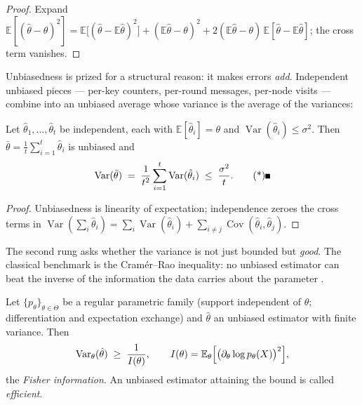 \begin{proof}
Expand $\mathbb{E}[(\hat\theta-\theta)^2] =
\mathbb{E}\bigl[(\hat\theta-\mathbb{E}\hat\theta)^2\bigr] +
(\mathbb{E}\hat\theta-\theta)^2 + 2(\mathbb{E}\hat\theta-\theta)\,
\mathbb{E}[\hat\theta-\mathbb{E}\hat\theta]$; the cross term vanishes.
\end{proof}

Unbiasedness is prized for a structural reason: it makes errors \emph{add}. Independent unbiased
pieces --- per-key counters, per-round messages, per-node visits --- combine into an unbiased
average whose variance is the average of the variances:

\begin{lemma}\label{lem:est-averaging}
Let $\hat\theta_1,\dots,\hat\theta_t$ be independent, each with
$\mathbb{E}[\hat\theta_i] = \theta$ and $\operatorname{Var}(\hat\theta_i) \le \sigma^2$. Then
$\bar\theta = \frac1t\sum_{i=1}^t \hat\theta_i$ is unbiased and
\[
\operatorname{Var}(\bar\theta) \;=\; \frac{1}{t^2}\sum_{i=1}^t
\operatorname{Var}(\hat\theta_i) \;\le\; \frac{\sigma^2}{t}. \eopm
\]
\end{lemma}

\begin{proof}
Unbiasedness is linearity of expectation; independence zeroes the cross terms in
$\operatorname{Var}(\sum_i \hat\theta_i) = \sum_i \operatorname{Var}(\hat\theta_i) +
\sum_{i\ne j}\operatorname{Cov}(\hat\theta_i,\hat\theta_j)$.
\end{proof}


The second rung asks whether the variance is not just bounded but \emph{good}. The classical
benchmark is the Cram\'er--Rao inequality: no unbiased estimator can beat the inverse of the
information the data carries about the parameter
\citep{estimation-theory-bg1,estimation-theory-bg2}.

\begin{theorem}\label{thm:est-cr}
Let $\{p_\theta\}_{\theta\in\Theta}$ be a regular parametric family (support independent of
$\theta$; differentiation and expectation exchange) and $\hat\theta$ an unbiased estimator with
finite variance. Then
\[
\operatorname{Var}_\theta(\hat\theta) \;\ge\; \frac{1}{I(\theta)},
\qquad
I(\theta) = \mathbb{E}_\theta\Bigl[\bigl(\partial_\theta \log p_\theta(X)\bigr)^2\Bigr],
\]
the \emph{Fisher information}. An unbiased estimator attaining the bound is called
\emph{efficient}. \eop
\end{theorem}

